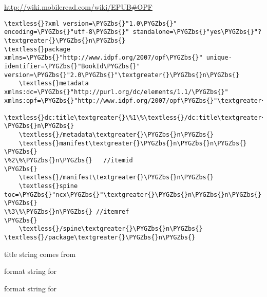 \documentclass[letterpaper,10pt,english]{sphinxmanual}
\def\PYGZbs{\char`\\}
\begin{document}
\begin{fulllineitems}
\label{epub:content_opf__ss}
\href{http://wiki.mobileread.com/wiki/EPUB\#OPF}{http://wiki.mobileread.com/wiki/EPUB\#OPF}

\begin{Verbatim}[commandchars=\\\{\}]
\textless{}?xml version=\PYGZbs{}"1.0\PYGZbs{}" encoding=\PYGZbs{}"utf-8\PYGZbs{}" standalone=\PYGZbs{}"yes\PYGZbs{}"?\textgreater{}\PYGZbs{}n\PYGZbs{}
\textless{}package xmlns=\PYGZbs{}"http://www.idpf.org/2007/opf\PYGZbs{}" unique-identifier=\PYGZbs{}"BookId\PYGZbs{}" version=\PYGZbs{}"2.0\PYGZbs{}"\textgreater{}\PYGZbs{}n\PYGZbs{}
    \textless{}metadata xmlns:dc=\PYGZbs{}"http://purl.org/dc/elements/1.1/\PYGZbs{}" xmlns:opf=\PYGZbs{}"http://www.idpf.org/2007/opf\PYGZbs{}"\textgreater{}\PYGZbs{}n\PYGZbs{}
        \textless{}dc:title\textgreater{}\%1\%\textless{}/dc:title\textgreater{} \PYGZbs{}n\PYGZbs{}
    \textless{}/metadata\textgreater{}\PYGZbs{}n\PYGZbs{}
    \textless{}manifest\textgreater{}\PYGZbs{}n\PYGZbs{}n\PYGZbs{}
\PYGZbs{}
\%2\%\PYGZbs{}n\PYGZbs{}   //itemid
\PYGZbs{}
    \textless{}/manifest\textgreater{}\PYGZbs{}n\PYGZbs{}
    \textless{}spine toc=\PYGZbs{}"ncx\PYGZbs{}"\textgreater{}\PYGZbs{}n\PYGZbs{}n\PYGZbs{}
\PYGZbs{}
\%3\%\PYGZbs{}n\PYGZbs{} //itemref
\PYGZbs{}
    \textless{}/spine\textgreater{}\PYGZbs{}n\PYGZbs{}
\textless{}/package\textgreater{}\PYGZbs{}n\PYGZbs{}
\end{Verbatim}

title string comes from {\hyperref[mobireader:mobireader::get_titleC]{}}

\end{fulllineitems}


\begin{fulllineitems}
\label{epub:itemid__ss}
format string for {\hyperref[epub:content_opf__ss]{}}

\end{fulllineitems}


\begin{fulllineitems}
\label{epub:itemref__ss}
format string for {\hyperref[epub:content_opf__ss]{}}

\end{fulllineitems}
\end{document}
